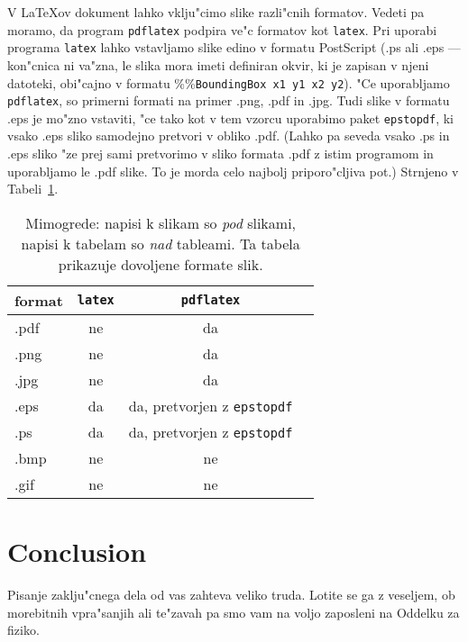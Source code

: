 V \LaTeX{}ov dokument lahko vklju"cimo slike razli"cnih formatov. 
Vedeti pa moramo, da program {\tt pdflatex} podpira ve"c formatov 
kot {\tt latex}. Pri uporabi programa {\tt latex} lahko vstavljamo 
slike edino v formatu PostScript (.ps ali .eps --- kon"cnica ni
va"zna, le slika mora imeti definiran okvir, ki je zapisan
v njeni datoteki, obi"cajno v formatu \%\%{\tt BoundingBox x1 y1 x2 y2}). 
"Ce uporabljamo {\tt pdflatex}, so primerni formati na primer 
.png, .pdf in .jpg.  Tudi slike v formatu .eps je mo"zno vstaviti,
"ce tako kot v tem vzorcu uporabimo paket {\tt epstopdf}, ki vsako
.eps sliko samodejno pretvori v obliko .pdf.  (Lahko pa seveda
vsako .ps in .eps sliko "ze prej sami pretvorimo v sliko formata .pdf
z istim programom in uporabljamo le .pdf slike.  To je morda
celo najbolj priporo"cljiva pot.)  Strnjeno v Tabeli~\ref{tbl1}.

\begin{table}[h]
\caption[Dovoljeni formati slik]{Mimogrede: napisi k slikam so {\sl pod\/} slikami, 
napisi k tabelam so {\sl nad\/} tableami.  Ta tabela prikazuje
dovoljene formate slik.}
\label{tbl1}
\begin{center}
\begin{tabular}{l|ccc}
format & {\tt latex}  & {\tt pdflatex} \\ \hline
.pdf & ne  & da  \\
.png & ne  & da  \\
.jpg & ne & da  \\
.eps & da & da, pretvorjen z {\tt epstopdf} \\
.ps & da & da, pretvorjen z {\tt epstopdf}  \\
.bmp & ne & ne \\
.gif & ne & ne 
\end{tabular}
\end{center}
\end{table}


\chapter{Conclusion}

Pisanje zaklju"cnega dela od vas zahteva veliko truda. 
Lotite se ga z veseljem, ob morebitnih vpra"sanjih 
ali te"zavah pa smo vam na voljo zaposleni na Oddelku za fiziko.



\nocite{*}
\cleardoublepage{}
{}



